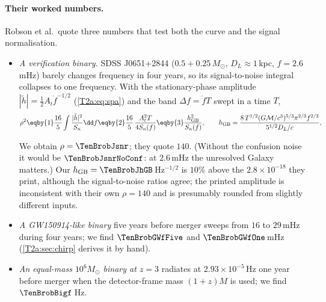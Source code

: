 \paragraph{Their worked numbers.} Robson et al.\ quote three numbers that test both the curve and the signal
normalisation.
\begin{itemize}[itemsep=2pt,leftmargin=1.2em]
  \item \emph{A verification binary.} SDSS J0651+2844 ($0.5+0.25\,M_\odot$, $D_L\approx1$\,kpc, $f=2.6$\,mHz) barely
        changes frequency in four years, so its signal-to-noise integral collapses to one frequency. With the
        stationary-phase amplitude $|\tilde h|=\tfrac12A_t\dot f^{-1/2}$ (\cref{T2a:eq:spa}) and the band
        $\Delta f=\dot fT$ swept in a time $T$,
        \begin{align*}
          \rho^2
          \eqby{1}\frac{16}5\int\frac{|\tilde h|^2}{S_n}\dd f
          \eqby{2}\frac{16}{5}\,\frac{A_t^2T}{4S_n(f)}
          \eqby{3}\frac{h_{\rm GB}^2}{S_n(f)},\qquad
          h_{\rm GB}=\frac{8\,T^{1/2}(G\mathcal M/c^3)^{5/3}\pi^{2/3}f^{2/3}}{5^{1/2}D_L/c},
        \end{align*}
        We obtain $\rho=\TenBrobJsnr$; they quote $140$. (Without the confusion noise it would be $\TenBrobJsnrNoConf$:
        at $2.6$\,mHz the unresolved Galaxy matters.) Our $h_{\rm GB}=\TenBrobJhGB$\,Hz$^{-1/2}$ is $10\%$ above the
        $2.8\times10^{-18}$ they print, although the signal-to-noise ratios agree; the printed amplitude is
        inconsistent with their own $\rho=140$ and is presumably rounded from slightly different inputs.
  \item \emph{A GW150914-like binary} five years before merger sweeps from $16$ to $29$\,mHz during four years; we find
        $\TenBrobGWfFive$ and $\TenBrobGWfOne$\,mHz (\cref{T2a:sec:chirp} derives it by hand).
  \item \emph{An equal-mass $10^6M_\odot$ binary at $z=3$} radiates at $2.93\times10^{-5}$\,Hz one year before merger when
        the detector-frame mass $(1+z)M$ is used; we find $\TenBrobBigf$\,Hz.
\end{itemize}

